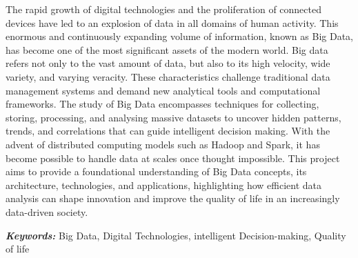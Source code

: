The rapid growth of digital technologies and the proliferation of connected devices have led to an explosion of data in all domains of human activity. This enormous and continuously expanding volume of information, known as Big Data, has become one of the most significant assets of the modern world. Big data refers not only to the vast amount of data, but also to its high velocity, wide variety, and varying veracity. These characteristics challenge traditional data management systems and demand new analytical tools and computational frameworks. The study of Big Data encompasses techniques for collecting, storing, processing, and analysing massive datasets to uncover hidden patterns, trends, and correlations that can guide intelligent decision making. With the advent of distributed computing models such as Hadoop and Spark, it has become possible to handle data at scales once thought impossible. This project aims to provide a foundational understanding of Big Data concepts, its architecture, technologies, and applications, highlighting how efficient data analysis can shape innovation and improve the quality of life in an increasingly data-driven society.
 
\textit{\textbf{Keywords:}} Big Data, Digital Technologies, intelligent Decision-making, Quality of life


\cleardoublepage
{}
{}
\listoffigures
\cleardoublepage
{}
{}
\tableofcontents
\justify
\cleardoublepage
\thispagestyle{plain}
\renewcommand{\chaptermark}[1]{ \markboth{#1}{} }
\renewcommand{\sectionmark}[1]{ \markright{#1} }
\renewcommand{\headrulewidth}{0.4pt} %
\renewcommand{\footrulewidth}{0.4pt}
\fancyhead[LE]{\textit{\nouppercase{\leftmark}} }
\fancyhead[RO]{\textit{\nouppercase{\rightmark}} }
\fancyfoot[RO,LE]{\thepage}
